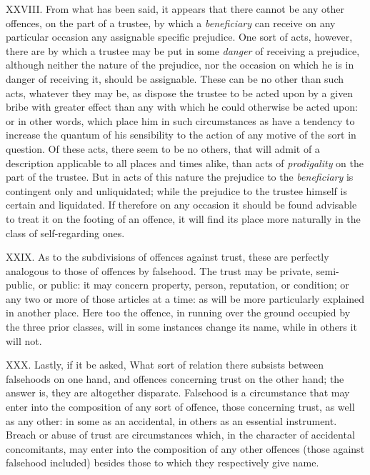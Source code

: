 \documentclass[12pt]{report}
\begin{document}
XXVIII. From what has been said, it appears that there cannot be any
other offences, on the part of a trustee, by which a \emph{beneficiary}
can receive on any particular occasion any assignable specific
prejudice. One sort of acts, however, there are by which a trustee may
be put in some \emph{danger} of receiving a prejudice, although neither
the nature of the prejudice, nor the occasion on which he is in danger
of receiving it, should be assignable. These can be no other than such
acts, whatever they may be, as dispose the trustee to be acted upon by a
given bribe with greater effect than any with which he could otherwise
be acted upon: or in other words, which place him in such circumstances
as have a tendency to increase the quantum of his sensibility to the
action of any motive of the sort in question. Of these acts, there seem
to be no others, that will admit of a description applicable to all
places and times alike, than acts of \emph{prodigality} on the part of
the trustee. But in acts of this nature the prejudice to the
\emph{beneficiary} is contingent only and unliquidated; while the
prejudice to the trustee himself is certain and liquidated. If therefore
on any occasion it should be found advisable to treat it on the footing
of an offence, it will find its place more naturally in the class of
self-regarding ones.

XXIX. As to the subdivisions of offences against trust, these are
perfectly analogous to those of offences by falsehood. The trust may be
private, semi-public, or public: it may concern property, person,
reputation, or condition; or any two or more of those articles at a
time: as will be more particularly explained in another place. Here too
the offence, in running over the ground occupied by the three prior
classes, will in some instances change its name, while in others it will
not.

XXX. Lastly, if it be asked, What sort of relation there subsists
between falsehoods on one hand, and offences concerning trust on the
other hand; the answer is, they are altogether disparate. Falsehood is a
circumstance that may enter into the composition of any sort of offence,
those concerning trust, as well as any other: in some as an accidental,
in others as an essential instrument. Breach or abuse of trust are
circumstances which, in the character of accidental concomitants, may
enter into the composition of any other offences (those against
falsehood included) besides those to which they respectively give
name.\\
\end{document}
